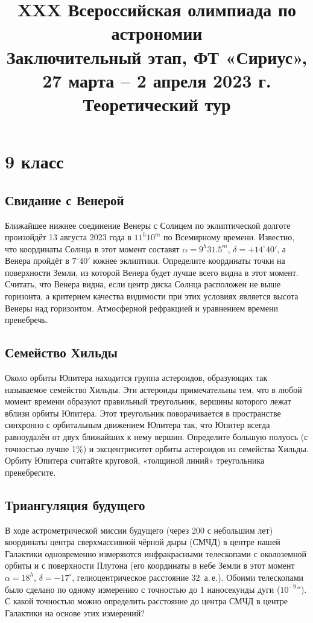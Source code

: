 \documentclass[12pt]{article}
\title{XXX Всероссийская олимпиада по астрономии\\
Заключительный этап, ФТ «Сириус», 27 марта -- 2 апреля 2023 г.\\
Теоретический тур}
\date{}
\begin{document}
\maketitle

\section*{9 класс}

\subsection{Свидание с Венерой}
Ближайшее нижнее соединение Венеры с Солнцем по эклиптической долготе произойдёт
13 августа 2023 года в $11^h10^m$ по Всемирному времени. Известно, что координаты
Солнца в этот момент составят $\alpha = 9^h31.5^m$, $\delta = +14^\circ40'$, а Венера
пройдёт в $7^\circ40'$ южнее эклиптики. Определите координаты точки на поверхности
Земли, из которой Венера будет лучше всего видна в этот момент. Считать, что Венера
видна, если центр диска Солнца расположен не выше горизонта, а критерием качества
видимости при этих условиях является высота Венеры над горизонтом. Атмосферной
рефракцией и уравнением времени пренебречь.

\subsection{Семейство Хильды}
Около орбиты Юпитера находится группа астероидов, образующих так называемое
семейство Хильды. Эти астероиды примечательны тем, что в любой момент времени
образуют правильный треугольник, вершины которого лежат вблизи орбиты Юпитера. Этот
треугольник поворачивается в пространстве синхронно с орбитальным движением Юпитера
так, что Юпитер всегда равноудалён от двух ближайших к нему вершин. Определите
большую полуось (с точностью лучше 1\%) и эксцентриситет орбиты астероидов из
семейства Хильды. Орбиту Юпитера считайте круговой, «толщиной линий» треугольника
пренебрегите.

\subsection{Триангуляция будущего}
В ходе астрометрической миссии будущего (через 200 с небольшим лет) координаты
центра сверхмассивной чёрной дыры (СМЧД) в центре нашей Галактики одновременно
измеряются инфракрасными телескопами с околоземной орбиты и с поверхности Плутона
(его координаты в небе Земли в этот момент $\alpha = 18^h$, $\delta = -17^\circ$,
гелиоцентрическое расстояние 32~а.\,е.). Обоими телескопами было сделано по одному
измерению с точностью до 1 наносекунды дуги ($10^{-9}{}''$). С какой точностью можно
определить расстояние до центра СМЧД в центре Галактики на основе этих измерений?
\end{document}
